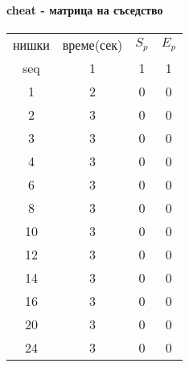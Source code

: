 \paragraph*{cheat - матрица на съседство}

\begin{center}
\begin{tabular}{ c c c c }
  нишки & време(сек) & $S_p$ & $E_p$ \\
  seq & 1 & 1 & 1 \\
  1 & 2 & 0 & 0 \\
  2 & 3 & 0 & 0 \\
  3 & 3 & 0 & 0 \\
  4 & 3 & 0 & 0 \\
  6 & 3 & 0 & 0 \\
  8 & 3 & 0 & 0 \\
  10 & 3 & 0 & 0 \\
  12 & 3 & 0 & 0 \\
  14 & 3 & 0 & 0 \\
  16 & 3 & 0 & 0 \\
  20 & 3 & 0 & 0 \\
  24 & 3 & 0 & 0 \\
\end{tabular}
\end{center}
